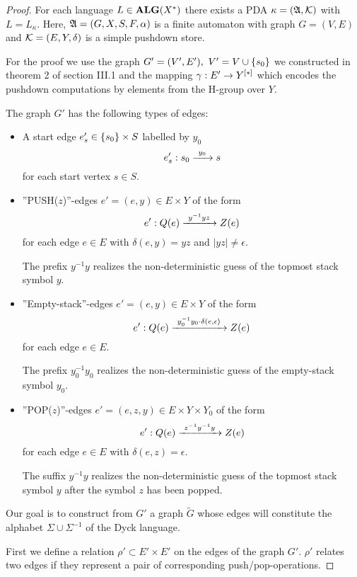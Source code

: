 \begin{proof}
For each language $L\in \mbox{{\bf ALG}}(X^*)$ there exists a PDA
$\kappa=(\mbox{$\mathfrak{A}$}, \mbox{$\mathcal{K}$})$ with $L = L_\kappa$. Here, $\mbox{$\mathfrak{A}$} = (G, X, S, F,
\alpha)$ is a finite automaton with graph $G=(V, E)$ and $\mbox{$\mathcal{K}$} = (E, Y,
\delta)$ is a simple pushdown store.

For the proof we use the graph $G'=(V',E'),\ V' = V \cup \mbox{$\{s_0\}$}$ we
constructed in theorem 2 of section III.1 and the mapping $\gamma: E' \to
\mbox{${Y}^{[*]}$}$ which encodes the pushdown computations by elements from the
H-group over $Y$.

The graph $G'$ has the following types of edges:
\begin{itemize}
  \item A start edge $e'_s \in \mbox{$\{s_0\}$} \times S$ labelled by $y_0$ 
  \[ e'_s: s_0 \xrightarrow{\ {y_0}\ } s \] 
  for each start vertex $s \in S$.
  
  \item ''PUSH($z$)''-edges $e'=(e, y) \in E \times Y$ of the form
  \[ e': Q(e) \xrightarrow{\ {y^{-1} y z}\ } Z(e) \]
  for each edge $e \in E$ with $\delta(e, y) = yz$ and $|yz| \neq \epsilon$. 
  
  The prefix $y^{-1} y$ realizes the non-deterministic guess of the topmost
  stack symbol $y$.
  
  \item ''Empty-stack''-edges $e'=(e, y) \in E \times Y$ of the form
  \[ e': Q(e) \xrightarrow{\ {y_0^{-1} y_0 \cdot \delta(e, \epsilon)}\ } Z(e) \]
  for each edge $e \in E$.
  
  The prefix $y_0^{-1} y_0$ realizes the non-deterministic guess of the
  empty-stack symbol $y_0$.
  
  \item ''POP($z$)''-edges $e'=(e, z, y) \in E \times Y \times Y_0$ of the form
  \[ e': Q(e) \xrightarrow{\ {z^{-1} y^{-1} y}\ } Z(e) \]
  for each edge $e \in E$ with $\delta(e, z) = \epsilon$.
  
  The suffix $y^{-1} y$ realizes the non-deterministic guess of the topmost
  stack symbol $y$ after the symbol $z$ has been popped.
\end{itemize}

Our goal is to construct from $G'$ a graph $\tilde{G}$ whose edges will
constitute the alphabet $\Sigma \cup \Sigma^{-1}$ of the Dyck language.

First we define a relation $\rho' \subset E' \times E'$ on the edges of the
graph $G'$. $\rho'$ relates two edges if they represent a pair of
corresponding push/pop-operations.


\end{proof}
